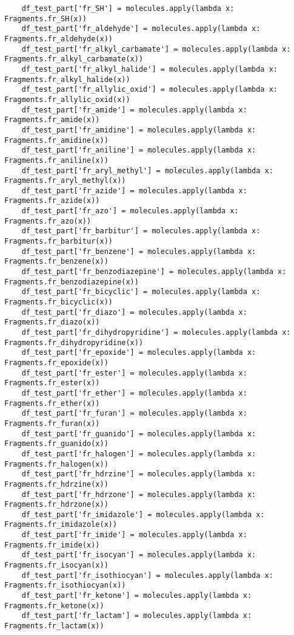 \documentclass[11pt, oneside]{article}   	%
\begin{document}
\begin{lstlisting}
    df_test_part['fr_SH'] = molecules.apply(lambda x: Fragments.fr_SH(x))
    df_test_part['fr_aldehyde'] = molecules.apply(lambda x: Fragments.fr_aldehyde(x))
    df_test_part['fr_alkyl_carbamate'] = molecules.apply(lambda x: Fragments.fr_alkyl_carbamate(x))
    df_test_part['fr_alkyl_halide'] = molecules.apply(lambda x: Fragments.fr_alkyl_halide(x))
    df_test_part['fr_allylic_oxid'] = molecules.apply(lambda x: Fragments.fr_allylic_oxid(x))
    df_test_part['fr_amide'] = molecules.apply(lambda x: Fragments.fr_amide(x))
    df_test_part['fr_amidine'] = molecules.apply(lambda x: Fragments.fr_amidine(x))
    df_test_part['fr_aniline'] = molecules.apply(lambda x: Fragments.fr_aniline(x))
    df_test_part['fr_aryl_methyl'] = molecules.apply(lambda x: Fragments.fr_aryl_methyl(x))
    df_test_part['fr_azide'] = molecules.apply(lambda x: Fragments.fr_azide(x))
    df_test_part['fr_azo'] = molecules.apply(lambda x: Fragments.fr_azo(x))
    df_test_part['fr_barbitur'] = molecules.apply(lambda x: Fragments.fr_barbitur(x))
    df_test_part['fr_benzene'] = molecules.apply(lambda x: Fragments.fr_benzene(x))
    df_test_part['fr_benzodiazepine'] = molecules.apply(lambda x: Fragments.fr_benzodiazepine(x))
    df_test_part['fr_bicyclic'] = molecules.apply(lambda x: Fragments.fr_bicyclic(x))
    df_test_part['fr_diazo'] = molecules.apply(lambda x: Fragments.fr_diazo(x))
    df_test_part['fr_dihydropyridine'] = molecules.apply(lambda x: Fragments.fr_dihydropyridine(x))
    df_test_part['fr_epoxide'] = molecules.apply(lambda x: Fragments.fr_epoxide(x))
    df_test_part['fr_ester'] = molecules.apply(lambda x: Fragments.fr_ester(x))
    df_test_part['fr_ether'] = molecules.apply(lambda x: Fragments.fr_ether(x))
    df_test_part['fr_furan'] = molecules.apply(lambda x: Fragments.fr_furan(x))
    df_test_part['fr_guanido'] = molecules.apply(lambda x: Fragments.fr_guanido(x))
    df_test_part['fr_halogen'] = molecules.apply(lambda x: Fragments.fr_halogen(x))
    df_test_part['fr_hdrzine'] = molecules.apply(lambda x: Fragments.fr_hdrzine(x))
    df_test_part['fr_hdrzone'] = molecules.apply(lambda x: Fragments.fr_hdrzone(x))
    df_test_part['fr_imidazole'] = molecules.apply(lambda x: Fragments.fr_imidazole(x))
    df_test_part['fr_imide'] = molecules.apply(lambda x: Fragments.fr_imide(x))
    df_test_part['fr_isocyan'] = molecules.apply(lambda x: Fragments.fr_isocyan(x))
    df_test_part['fr_isothiocyan'] = molecules.apply(lambda x: Fragments.fr_isothiocyan(x))
    df_test_part['fr_ketone'] = molecules.apply(lambda x: Fragments.fr_ketone(x))
    df_test_part['fr_lactam'] = molecules.apply(lambda x: Fragments.fr_lactam(x))

\end{lstlisting}
\end{document}
